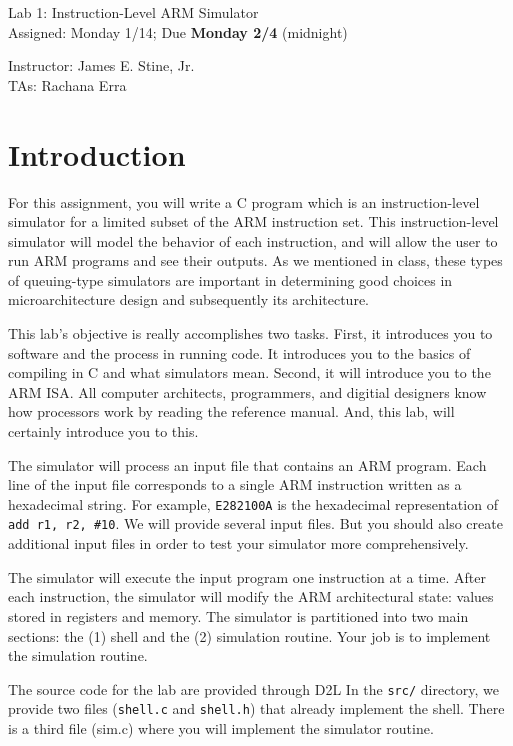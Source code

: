 \documentclass{article}
\newcommand{\myassignment}{Lab 1: Instruction-Level ARM Simulator}
\newcommand{\myduedate}{Assigned: Monday 1/14; Due \textbf{Monday 2/4} (midnight)}
\newcommand{\myinstructor}{Instructor: James E. Stine, Jr.}
\newcommand{\mytas}{TAs: Rachana Erra}
\begin{document}
\begin{center}
  {\huge \myassignment} \\
  {\large \myduedate} \\
  \begin{flushright}
  \myinstructor \\
  \mytas \\
  \end{flushright}
\end{center}

\section{Introduction}

For this assignment, you will write a C program which is an
instruction-level simulator for a limited subset of the ARM
instruction set. This instruction-level simulator will model the
behavior of each instruction, and will allow the user to run ARM
programs and see their outputs.  As we mentioned in class, these types
of queuing-type simulators are important in determining good choices
in microarchitecture design and subsequently its architecture.

This lab's objective is really accomplishes two tasks.  First, it
introduces you to software and the process in running code.  It
introduces you to the basics of compiling in C and what simulators
mean.  Second, it will introduce you to the ARM ISA.
All computer architects, programmers, and digitial
designers know how processors work by reading the reference manual.
And, this lab, will certainly introduce you to this.

The simulator will process an input file that contains an ARM
program. Each line of the input file corresponds to a single ARM
instruction written as a hexadecimal string. For example,
\verb+E282100A+ is
the hexadecimal representation of \verb+add r1, r2, #10+. We will
provide several input files. But you should also create additional
input files in order to test your simulator more comprehensively.

The simulator will execute the input program one instruction at a
time. After each instruction, the simulator will modify the ARM
architectural state: values stored in registers and memory. The
simulator is partitioned into two main sections: the (1) shell and the
(2) simulation routine. Your job is to implement the simulation
routine.

The source code for the lab are provided 
through D2L In the \verb+src/+ directory, we provide two
files (\verb+shell.c+ and \verb+shell.h+) that already implement the shell. 
There is a third file (sim.c) where you will implement the simulator
routine.
\end{document}
